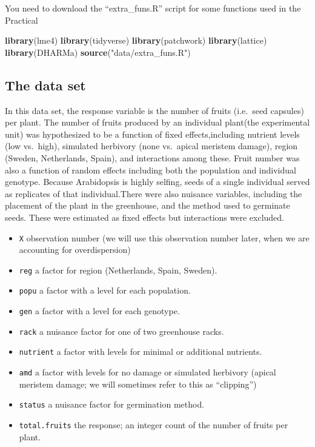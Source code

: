 \documentclass[
  12pt,
]{book}
\newenvironment{Shaded}{\begin{snugshade}}{\end{snugshade}}
\newcommand{\KeywordTok}[1]{\textcolor[rgb]{0.13,0.29,0.53}{\textbf{#1}}}
\newcommand{\NormalTok}[1]{#1}
\newcommand{\StringTok}[1]{\textcolor[rgb]{0.31,0.60,0.02}{#1}}
\providecommand{\tightlist}{%
  \setlength{\itemsep}{0pt}\setlength{\parskip}{0pt}}
\begin{document}
You need to download the ``extra\_funs.R'' script for some functions used in the Practical

\begin{Shaded}
\begin{Highlighting}[]
\KeywordTok{library}\NormalTok{(lme4)}
\KeywordTok{library}\NormalTok{(tidyverse)}
\KeywordTok{library}\NormalTok{(patchwork)}
\KeywordTok{library}\NormalTok{(lattice)}
\KeywordTok{library}\NormalTok{(DHARMa)}
\KeywordTok{source}\NormalTok{(}\StringTok{"data/extra\_funs.R"}\NormalTok{)}
\end{Highlighting}
\end{Shaded}

\hypertarget{the-data-set}{%
\subsection{The data set}\label{the-data-set}}

In this data set, the response variable is the number of fruits (i.e.~seed capsules) per plant. The number of fruits produced by an individual plant(the experimental unit) was hypothesized to be a function of fixed effects,including nutrient levels (low vs.~high), simulated herbivory (none vs.~apical meristem damage), region (Sweden, Netherlands, Spain), and interactions among these. Fruit number was also a function of random effects including both the population and individual genotype. Because Arabidopsis is highly selfing, seeds of a single individual served as replicates of that individual.There were also nuisance variables, including the placement of the plant in the greenhouse, and the method used to germinate seeds. These were estimated as fixed effects but interactions were excluded.

\begin{itemize}
\tightlist
\item
  \texttt{X} observation number (we will use this observation number later, when we are accounting for overdispersion)
\item
  \texttt{reg} a factor for region (Netherlands, Spain, Sweden).
\item
  \texttt{popu} a factor with a level for each population.
\item
  \texttt{gen} a factor with a level for each genotype.
\item
  \texttt{rack} a nuisance factor for one of two greenhouse racks.
\item
  \texttt{nutrient} a factor with levels for minimal or additional nutrients.
\item
  \texttt{amd} a factor with levels for no damage or simulated herbivory (apical meristem damage; we will sometimes refer to this as ``clipping'')
\item
  \texttt{status} a nuisance factor for germination method.
\item
  \texttt{total.fruits} the response; an integer count of the number of fruits per plant.
\end{itemize}
\end{document}
